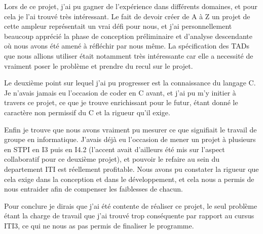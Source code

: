 Lors de ce projet, j'ai pu gagner de l'expérience dans différents domaines, et pour cela je l'ai trouvé très intéressant. Le fait de devoir créer de A à Z un projet de cette ampleur représentait un vrai défi pour nous, et j'ai personnellement beaucoup apprécié la phase de conception préliminaire et d'analyse descendante où nous avons été amené à réfléchir par nous même. La spécification des TADs que nous allions utiliser était notamment très intéressante car elle a necessité de vraiment poser le problème et prendre du recul sur le projet.

Le deuxième point sur lequel j'ai pu progresser est la connaissance du langage C. Je n'avais jamais eu l'occasion de coder en C avant, et j'ai pu m'y initier à travers ce projet, ce que je trouve enrichissant pour le futur, étant donné le caractère non permissif du C et la rigueur qu'il exige.

Enfin je trouve que nous avons vraiment pu mesurer ce que signifiait le travail de groupe en informatique. J'avais déjà eu l'occasion de mener un projet à plusieurs en STPI en I3 puis en I4.2 (l'accent avait d'ailleurs été mis sur l'aspect collaboratif pour ce deuxième projet), et pouvoir le refaire au sein du departement ITI est réellement profitable. Nous avons pu constater la rigueur que cela exige dans la conception et dans le développement, et cela nous a permis de nous entraider afin de compenser les faiblesses de chacun.

Pour conclure je dirais que j'ai été contente de réaliser ce projet, le seul problème étant la charge de travail que j'ai trouvé trop conséquente par rapport au cursus ITI3, ce qui ne nous as pas permis de finaliser le programme. 
